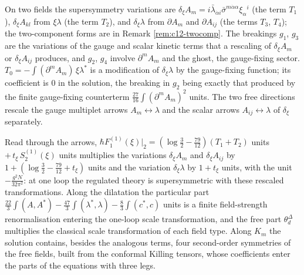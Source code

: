 \begin{remark}
On two fields the supersymmetry variations are $\delta_\xi A_m=i\bar\lambda_{\dot\alpha i}\bar\sigma^{m\dot\alpha\alpha}\xi_\alpha{}^i$ (the term $T_1$), $\delta_\xi A_{kl}$ from $\xi\lambda$ (the term $T_2$), and $\delta_\xi\lambda$ from $\partial A_m$ and $\partial A_{ij}$ (the terms $T_3$, $T_4$); the two-component forms are in Remark \ref{rem:c12-twocomp}. The breakings $g_1$, $g_3$ are the variations of the gauge and scalar kinetic terms that a rescaling of $\delta_\xi A_m$ or $\delta_\xi A_{ij}$ produces, and $g_2$, $g_4$ involve $\partial^mA_m$ and the ghost, the gauge-fixing sector. $T_0=-\int(\partial^mA_m)\,\xi\lambda^*$ is a modification of $\delta_\xi\lambda$ by the gauge-fixing function; its coefficient is $0$ in the solution, the breaking in $g_2$ being exactly that produced by the finite gauge-fixing counterterm $\tfrac{27}{16}\int(\partial^mA_m)^2$ units. The two free directions rescale the gauge multiplet arrows $A_m\leftrightarrow\lambda$ and the scalar arrows $A_{ij}\leftrightarrow\lambda$ of $\delta_\xi$ separately.
\end{remark}

\begin{remark}
Read through the arrows, $\hbar F_1^{(1)}(\xi)|_2=(\log\tfrac32-\tfrac{79}{12})(T_1+T_2)$ units $+\,t_\xi\,S^{(1)}_2(\xi)$ units multiplies the variations $\delta_\xi A_m$ and $\delta_\xi A_{ij}$ by $1+(\log\tfrac32-\tfrac{79}{12}+t_\xi)$ units and the variation $\delta_\xi\lambda$ by $1+t_\xi$ units, with the unit $-\tfrac{g^2N}{32\pi^2}$: at one loop the regulated theory is supersymmetric with these rescaled transformations. Along the dilatation the particular part $\tfrac{22}3\int(A,A^*)-\tfrac{47}3\int(\lambda^*,\lambda)-\tfrac83\int(c^*,c)$ units is a finite field-strength renormalisation entering the one-loop scale transformation, and the free part $\theta^\Delta_d$ multiplies the classical scale transformation of each field type. Along $K_m$ the solution contains, besides the analogous terms, four second-order symmetries of the free fields, built from the conformal Killing tensors, whose coefficients enter the parts of the equations with three legs.
\end{remark}

